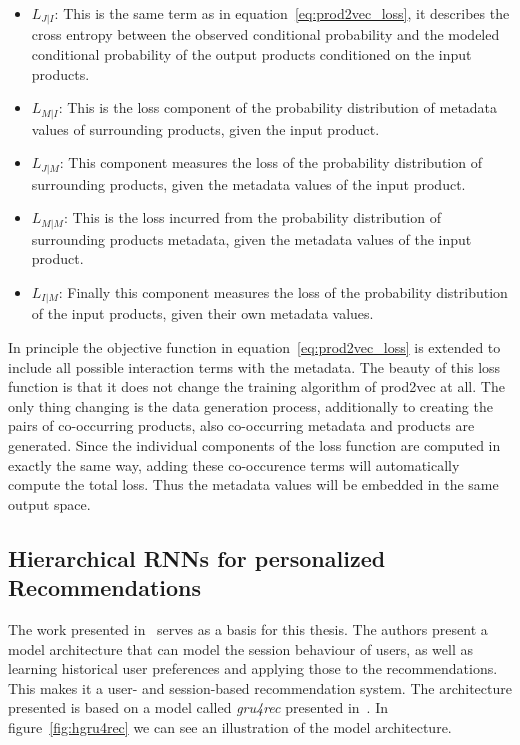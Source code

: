 \begin{itemize}
    \item $L_{J|I}$: This is the same term as in equation~\ref{eq:prod2vec_loss}, it describes the cross entropy between the observed conditional probability and the modeled conditional probability of the output products conditioned on the input products.
    \item $L_{M|I}$: This is the loss component of the probability distribution of metadata values of surrounding products, given the input product.
    \item $L_{J|M}$: This component measures the loss of the probability distribution of surrounding products, given the metadata values of the input product.
    \item $L_{M|M}$: This is the loss incurred from the probability distribution of surrounding products metadata, given the metadata values of the input product.
    \item $L_{I|M}$: Finally this component measures the loss of the probability distribution of the input products, given their own metadata values.
\end{itemize}
In principle the objective function in equation~\ref{eq:prod2vec_loss} is extended to include all possible interaction terms with the metadata.
The beauty of this loss function is that it does not change the training algorithm of prod2vec at all.
The only thing changing is the data generation process, additionally to creating the pairs of co-occurring products, also co-occurring metadata and products are generated.
Since the individual components of the loss function are computed in exactly the same way, adding these co-occurence terms will automatically compute the total loss.
Thus the metadata values will be embedded in the same output space.
\subsection{Hierarchical RNNs for personalized Recommendations}
The work presented in~\cite{hierarchical} serves as a basis for this thesis.
The authors present a model architecture that can model the session behaviour of users, as well as learning historical user preferences and applying those to the recommendations.
This makes it a user- and session-based recommendation system.
The architecture presented is based on a model called \emph{gru4rec} presented in~\cite{gru4rec}.
In figure~\ref{fig:hgru4rec} we can see an illustration of the model architecture.

